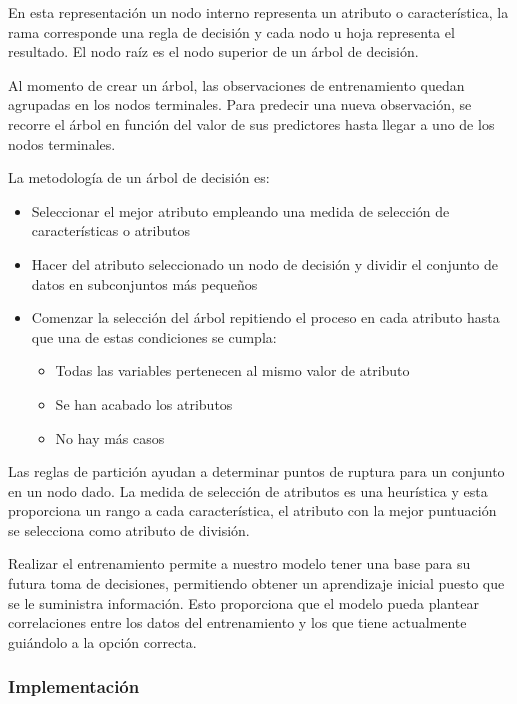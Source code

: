 \documentclass[journal]{IEEEtran}                                                          %
\begin{document}
            En esta representación un nodo interno representa un atributo o característica, la rama corresponde una regla de decisión y cada nodo u hoja representa el resultado. El nodo raíz es el nodo superior de un árbol de decisión.

            Al momento de crear un árbol, las observaciones de entrenamiento quedan agrupadas en los nodos terminales. Para predecir una nueva observación, se recorre el árbol en función del valor de sus predictores hasta llegar a uno de los nodos terminales.

            La metodología de un árbol de decisión es:
            \begin{itemize}
                \item Seleccionar el mejor atributo empleando una medida de selección de características o atributos
                \item Hacer del atributo seleccionado un nodo de decisión y dividir el conjunto de datos en subconjuntos más pequeños
                \item Comenzar la selección del árbol repitiendo el proceso en cada atributo hasta que una de estas condiciones se cumpla: \begin{itemize}
                    \item Todas las variables pertenecen al mismo valor de atributo
                    \item Se han acabado los atributos
                    \item No hay más casos
                \end{itemize}
            \end{itemize}

            Las reglas de partición ayudan a determinar puntos de ruptura para un conjunto en un nodo dado. La medida de selección de atributos es una heurística y esta proporciona un rango a cada característica, el atributo con la mejor puntuación se selecciona como atributo de división.

            Realizar el entrenamiento permite a nuestro modelo tener una base para su futura toma de decisiones, permitiendo obtener un aprendizaje inicial puesto que se le suministra información. Esto proporciona que el modelo pueda plantear correlaciones entre los datos del entrenamiento y los que tiene actualmente guiándolo a la opción correcta.

            \subsubsection{Implementación}
\end{document}
